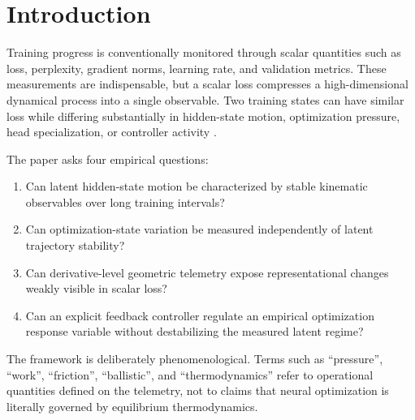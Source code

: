 \documentclass[11pt,twocolumn]{article}
\begin{document}
\begin{abstract}
The dataset composition spans a rich local anchor mix (Czech fantasy prose, Traditional Chinese Medicine, Stanford Philosophy, scriptural texts, and domain-specific knowledge shards) combined with a high-entropy expansion corpus (90\% FineWeb-Edu, 10\% FineWeb Original) under a 50,000-step pH-Stirred Mixture Protocol. Statistical analysis proves that loss movements and structural head differentiation are uncorrelated with batch composition ($r = +0.0543, p = 0.3004$), confirming that latent dynamics are driven by intrinsic optimization physics. The resulting framework is presented as an empirical observatory and control system rather than a claim that neural networks constitute thermodynamic systems in the physical sense. Paper I establishes the dynamical layer of a broader three-paper program: trajectory telemetry, completion detection, and runtime trajectory governance.
\end{abstract}

\section{Introduction}
Training progress is conventionally monitored through scalar quantities such as loss, perplexity, gradient norms, learning rate, and validation metrics. These measurements are indispensable, but a scalar loss compresses a high-dimensional dynamical process into a single observable. Two training states can have similar loss while differing substantially in hidden-state motion, optimization pressure, head specialization, or controller activity \cite{slt, massif}.

The paper asks four empirical questions:
\begin{enumerate}
\item Can latent hidden-state motion be characterized by stable kinematic observables over long training intervals?
\item Can optimization-state variation be measured independently of latent trajectory stability?
\item Can derivative-level geometric telemetry expose representational changes weakly visible in scalar loss?
\item Can an explicit feedback controller regulate an empirical optimization response variable without destabilizing the measured latent regime?
\end{enumerate}

The framework is deliberately phenomenological. Terms such as ``pressure'', ``work'', ``friction'', ``ballistic'', and ``thermodynamics'' refer to operational quantities defined on the telemetry, not to claims that neural optimization is literally governed by equilibrium thermodynamics.
\end{document}
